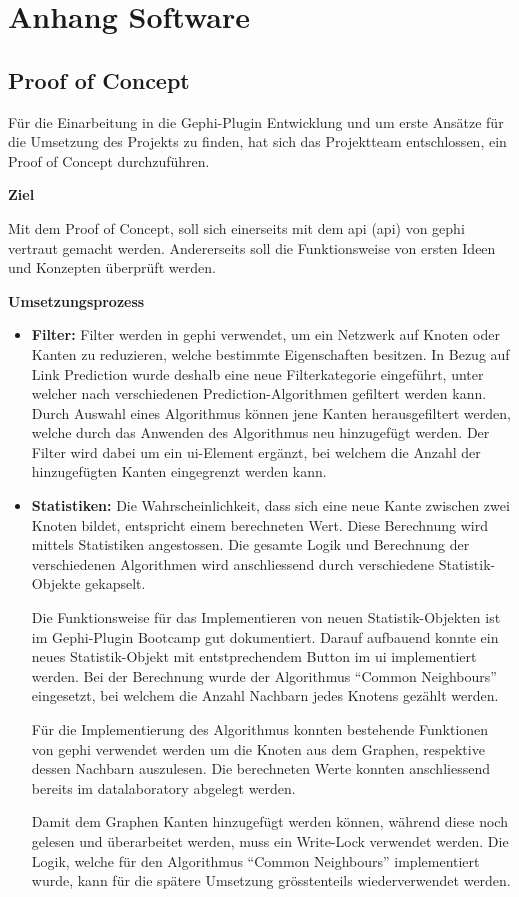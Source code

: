 \chapter{Anhang Software}

\section{Proof of Concept}
\label{poc}

Für die Einarbeitung in die Gephi-Plugin Entwicklung und um erste Ansätze für die Umsetzung des Projekts zu finden, hat
sich das Projektteam entschlossen, ein Proof of Concept durchzuführen.

\textbf{Ziel}

Mit dem Proof of Concept, soll sich einerseits mit dem \acl{api} (\acs{api}) von \acs{gephi} vertraut gemacht werden.
Andererseits soll die Funktionsweise von ersten Ideen und Konzepten überprüft werden.

\textbf{Umsetzungsprozess}

\begin{itemize}
    \item \textbf{Filter:} Filter werden in \acs{gephi} verwendet, um ein Netzwerk auf Knoten oder Kanten zu reduzieren, welche bestimmte Eigenschaften besitzen.
    In Bezug auf Link Prediction wurde deshalb eine neue Filterkategorie eingeführt, unter welcher nach verschiedenen Prediction-Algorithmen gefiltert werden kann.
    Durch Auswahl eines Algorithmus können jene Kanten herausgefiltert werden, welche durch das Anwenden des Algorithmus neu hinzugefügt werden.
    Der Filter wird dabei um ein \acs{ui}-Element ergänzt, bei welchem die Anzahl der hinzugefügten Kanten eingegrenzt werden kann.

    \item \textbf{Statistiken:} Die Wahrscheinlichkeit, dass sich eine neue Kante zwischen zwei Knoten bildet, entspricht einem berechneten Wert.
    Diese Berechnung wird mittels Statistiken angestossen. Die gesamte Logik und Berechnung der verschiedenen Algorithmen wird anschliessend
    durch verschiedene Sta\-tis\-tik-Ob\-jek\-te gekapselt.

    Die Funktionsweise für das Implementieren von neuen Sta\-tis\-tik-Ob\-jek\-ten ist im Gephi-Plugin Bootcamp gut dokumentiert. Darauf aufbauend
    konnte ein neues Statistik-Objekt mit entstprechendem Button im \acs{ui} implementiert werden. Bei der Berechnung wurde der Algorithmus
    ``Common Neighbours'' eingesetzt, bei welchem die Anzahl Nachbarn jedes Knotens gezählt werden.

    Für die Implementierung des Algorithmus konnten bestehende Funktionen von \acs{gephi} verwendet werden um die Knoten aus dem Graphen, respektive
    dessen Nachbarn auszulesen. Die berechneten Werte konnten anschliessend bereits im \acs{datalaboratory} abgelegt werden.

    Damit dem Graphen Kanten hinzugefügt werden können, während diese noch gelesen und überarbeitet werden, muss ein Write-Lock
    verwendet werden. Die Logik, welche für den Algorithmus ``Common Neighbours'' implementiert wurde, kann für die spätere Umsetzung
    grösstenteils wiederverwendet werden.
\end{itemize}

